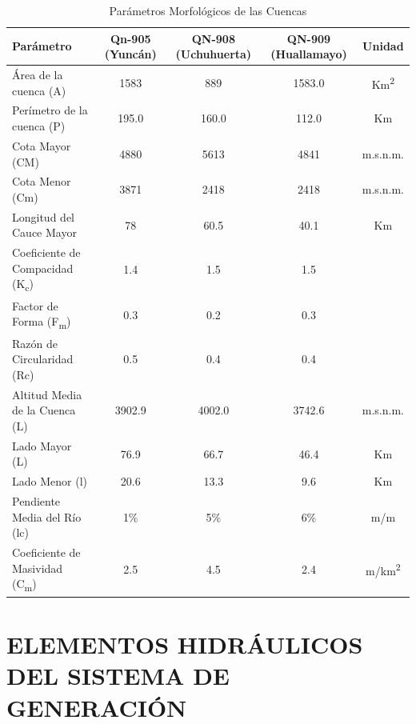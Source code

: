 \begin{table}[ht]
\centering
\caption{Parámetros Morfológicos de las Cuencas}
\label{tab05}
\small
\begin{tabular}{l c c c c}
\toprule
\textbf{Parámetro} & \textbf{Qn-905 (Yuncán)} & \textbf{QN-908 (Uchuhuerta)} &
\textbf{QN-909 (Huallamayo)} & \textbf{Unidad} \\
\midrule
Área de la cuenca (A)                           & 1583   & 889    & 1583.0   &
Km\textsuperscript{2} \\
Perímetro de la cuenca (P)                      & 195.0  & 160.0  & 112.0    &
Km \\
Cota Mayor (CM)                                 & 4880   & 5613   & 4841     &
m.s.n.m. \\
Cota Menor (Cm)                                 & 3871   & 2418   & 2418     &
m.s.n.m. \\
Longitud del Cauce Mayor                        & 78     & 60.5   & 40.1     &
Km \\
Coeficiente de Compacidad (K\textsubscript{c})  & 1.4    & 1.5    & 1.5      &
\\
Factor de Forma (F\textsubscript{m})            & 0.3    & 0.2    & 0.3      &
\\
Razón de Circularidad (Rc)                      & 0.5    & 0.4    & 0.4      &
\\
Altitud Media de la Cuenca (L)                  & 3902.9 & 4002.0 & 3742.6   &
m.s.n.m. \\
Lado Mayor (L)                                  & 76.9   & 66.7   & 46.4     &
Km \\
Lado Menor (l)                                  & 20.6   & 13.3   & 9.6      &
Km \\
Pendiente Media del Río (lc)                    & 1\%    & 5\%    & 6\%      &
m/m \\
Coeficiente de Masividad (C\textsubscript{m})   & 2.5    & 4.5    & 2.4      &
m/km\textsuperscript{2} \\
\bottomrule
\end{tabular}
\end{table}

\section{ELEMENTOS HIDRÁULICOS DEL SISTEMA DE GENERACIÓN}
\label{section:ElementosHidraulicos}

